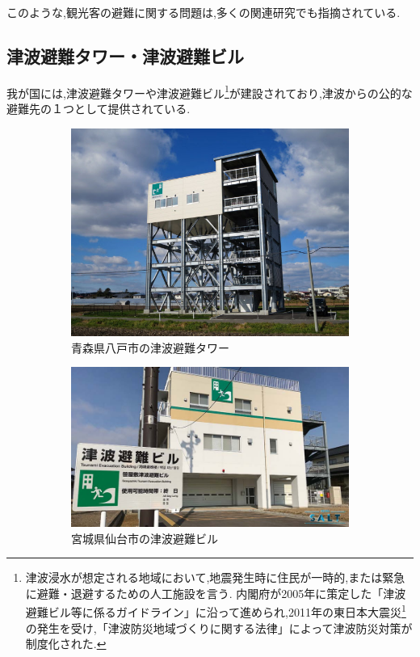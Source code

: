 このような,観光客の避難に関する問題は,多くの関連研究でも指摘されている.

\subsection{津波避難タワー・津波避難ビル}
我が国には,津波避難タワーや津波避難ビル\footnote{津波浸水が想定される地域において,地震発生時に住民が一時的,または緊急に避難・退避するための人工施設を言う.
内閣府が2005年に策定した「津波避難ビル等に係るガイドライン」に沿って進められ,2011年の東日本大震災\footnote{2011年3月11日14時46分頃に三陸沖の宮城県牡鹿半島の東南東130km付近を震源とする我が国最大規模の地震災害.}の発生を受け,「津波防災地域づくりに関する法律」によって津波防災対策が制度化された.}が建設されており,津波からの公的な避難先の１つとして提供されている.
\begin{figure}[H]
  \centering
  \begin{subfigure}{0.45\textwidth}
      \centering
      \includegraphics[width=\textwidth]{Figures/https___imgix-proxy.n8s.jp_DSXMZO6372684011092020CC1001-PN1-2.jpg}
      \caption{青森県八戸市の津波避難タワー}
      \label{fig:image1}
  \end{subfigure}
  \begin{subfigure}{0.5\textwidth}
      \centering
      \includegraphics[width=\textwidth]{Figures/20220311_1.jpg}
      \caption{宮城県仙台市の津波避難ビル}
      \label{fig:image2}
  \end{subfigure}
  \caption{}
  \label{fig:side_by_side}
\end{figure}
